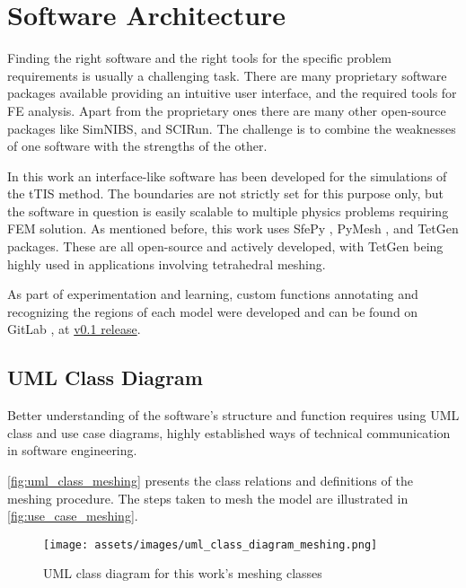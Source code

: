 \pagebreak
\chapter{Software Architecture}
\label{chap:soft_arch}

Finding the right software and the right tools for the specific problem requirements is usually a challenging task. There are many proprietary software packages available providing an intuitive user interface, and the required tools for \gls{FE} analysis. Apart from the proprietary ones there are many other open-source packages like \gls{SimNIBS}, and SCIRun. The challenge is to combine the weaknesses of one software with the strengths of the other.

In this work an interface-like software has been developed for the simulations of the \gls{tTIS} method. The boundaries are not strictly set for this purpose only, but the software in question is easily scalable to multiple physics problems requiring \gls{FEM} solution. As mentioned before, this work uses SfePy \cite{Cimrman2019}, PyMesh \cite{pymesh}, and TetGen \cite{tetgen} packages. These are all open-source and actively developed, with TetGen \cite{tetgen} being highly used in applications involving tetrahedral meshing.

As part of experimentation and learning, custom functions annotating and recognizing the regions of each model were developed and can be found on GitLab \cite{thesis_repo}, at \href{https://gitlab.com/ttis-simulations/ttis-software/-/releases#v0.1}{v0.1 release}. 

\section{UML Class Diagram}

Better understanding of the software's structure and function requires using \gls{UML} class and use case diagrams, highly established ways of technical communication in software engineering.

\autoref{fig:uml_class_meshing} presents the class relations and definitions of the meshing procedure. The steps taken to mesh the model are illustrated in \autoref{fig:use_case_meshing}.

\begin{figure}[H]
    \centering
    \texttt{[image: assets/images/uml\_class\_diagram\_meshing.png]}
    \caption{\gls{UML} class diagram for this work's meshing classes}
    \label{fig:uml_class_meshing}
\end{figure}

